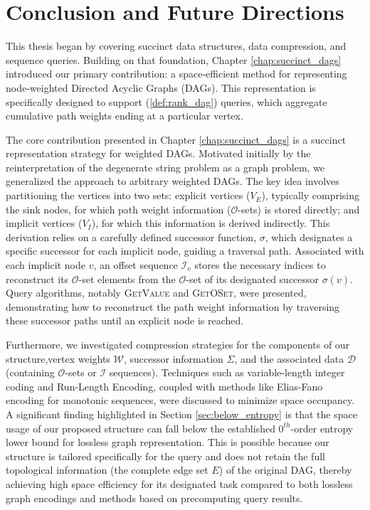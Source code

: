 \chapter{Conclusion and Future Directions}
\label{chap:conclusion}

This thesis began by covering succinct data structures, data compression, and sequence queries. Building on that foundation, Chapter \ref{chap:succinct_dags} introduced our primary contribution: a space-efficient method for representing node-weighted Directed Acyclic Graphs (DAGs). This representation is specifically designed to support \Rank{} (\ref{def:rank_dag}) queries, which aggregate cumulative path weights ending at a particular vertex.

The core contribution presented in Chapter \ref{chap:succinct_dags} is a succinct representation strategy for weighted DAGs. Motivated initially by the reinterpretation of the degenerate string problem as a graph problem, we generalized the approach to arbitrary weighted DAGs. The key idea involves partitioning the vertices into two sets: explicit vertices ($V_E$), typically comprising the sink nodes, for which path weight information ($\mathcal{O}$-sets) is stored directly; and implicit vertices ($V_I$), for which this information is derived indirectly. This derivation relies on a carefully defined successor function, $\sigma$, which designates a specific successor for each implicit node, guiding a traversal path. Associated with each implicit node $v$, an offset sequence $\mathcal{I}_v$ stores the necessary indices to reconstruct its $\mathcal{O}$-set elements from the $\mathcal{O}$-set of its designated successor $\sigma(v)$. Query algorithms, notably \textsc{GetValue} and \textsc{GetOSet}, were presented, demonstrating how to reconstruct the path weight information by traversing these successor paths until an explicit node is reached.

Furthermore, we investigated compression strategies for the components of our structure,vertex weights $\mathcal{W}$, successor information $\Sigma$, and the associated data $\mathcal{D}$ (containing $\mathcal{O}$-sets or $\mathcal{I}$ sequences). Techniques such as variable-length integer coding and Run-Length Encoding, coupled with methods like Elias-Fano encoding for monotonic sequences, were discussed to minimize space occupancy. A significant finding highlighted in Section \ref{sec:below_entropy} is that the space usage of our proposed structure can fall below the established $0^{th}$-order entropy lower bound for lossless graph representation. This is possible because our structure is tailored specifically for the \Rank{} query and does not retain the full topological information (the complete edge set $E$) of the original DAG, thereby achieving high space efficiency for its designated task compared to both lossless graph encodings and methods based on precomputing query results.

